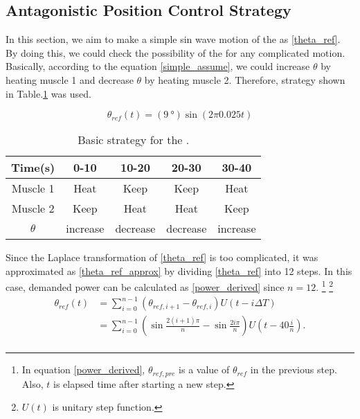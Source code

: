 \subsection{Antagonistic Position Control Strategy}
In this section, we aim to make a simple sin wave motion of the \anta as \eqref{theta_ref}. By doing this, we could check the possibility of the \apc for any complicated motion. Basically, according to the equation \eqref{simple_assume}, we could increase $\theta$ by heating muscle 1 and decrease $\theta$ by heating muscle 2. Therefore, strategy shown in Table.\ref{table_apc_basic} was used.

\begin{equation}\label{theta_ref}
\theta_{ref}(t)=(\SI{9}{\degree})\sin(2\pi 0.025t)
\end{equation}

\begin{table}[t]
	\caption{Basic strategy for the \apc.}
	\label{table_apc_basic}
	\begin{center}
		\begin{tabular}{c||c|c|c|c}
			\hline
			Time(s) & 0-10 & 10-20 & 20-30 & 30-40 \\
			\hline
			Muscle 1 & Heat & Keep & Keep & Heat \\
			Muscle 2 & Keep & Heat & Heat & Keep \\
			\hline
			$\theta$ & increase & decrease & decrease & increase \\
			\hline
		\end{tabular}
	\end{center}
\end{table}

Since the Laplace transformation of \eqref{theta_ref} is too complicated, 
it was approximated as \eqref{theta_ref_approx} by dividing \eqref{theta_ref} into 12 steps. In this case, demanded power can be calculated as \eqref{power_derived} since $n=12$. 
\footnote{In equation \eqref{power_derived}, $\theta_{ref,pre}$ is a value of $\theta_{ref}$ in the previous step. Also, $t$ is elapsed time after starting a new step.}
\footnote{$U(t)$ is unitary step function.}
\begin{equation} \label{theta_ref_approx}
\begin{aligned} 
\theta_{ref}(t) & = \sum_{i=0}^{n-1}{(\theta_{ref,i+1}-\theta_{ref,i})U(t-i\Delta T)} \\
& = \sum_{i=0}^{n-1}{\left(\sin{\frac{2(i+1)\pi}{n}}-\sin{\frac{2i\pi}{n}}\right)U\left(t-40\frac{i}{n}\right)}. \\
\end{aligned}
\end{equation}

